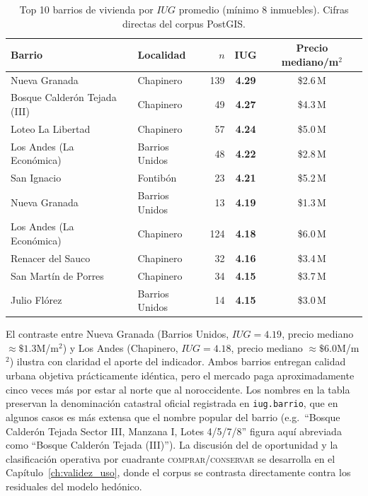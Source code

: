 \documentclass[12pt, a4paper, twoside, openright]{report}
\theoremstyle{plain}
\theoremstyle{definition}
\newcommand{\IUG}{IUG}             %
\begin{document}
\begin{table}[htbp]
\centering
\caption{Top 10 barrios de vivienda por $\IUG{}$ promedio (mínimo 8 inmuebles). Cifras directas del corpus PostGIS.}
\label{tab:iug_barrio_res}
\small
\begin{tabular}{@{}llrcc@{}}
\toprule
\textbf{Barrio} & \textbf{Localidad} & $n$ & $\boldsymbol{\IUG}$ & \textbf{Precio mediano/m$^2$} \\
\midrule
Nueva Granada                 & Chapinero      & 139 & \textbf{4.29} & \$2.6\,M \\
Bosque Calderón Tejada (III)  & Chapinero      &  49 & \textbf{4.27} & \$4.3\,M \\
Loteo La Libertad             & Chapinero      &  57 & \textbf{4.24} & \$5.0\,M \\
Los Andes (La Económica)      & Barrios Unidos &  48 & \textbf{4.22} & \$2.8\,M \\
San Ignacio                   & Fontibón       &  23 & \textbf{4.21} & \$5.2\,M \\
Nueva Granada                 & Barrios Unidos &  13 & \textbf{4.19} & \$1.3\,M \\
Los Andes (La Económica)      & Chapinero      & 124 & \textbf{4.18} & \$6.0\,M \\
Renacer del Sauco             & Chapinero      &  32 & \textbf{4.16} & \$3.4\,M \\
San Martín de Porres          & Chapinero      &  34 & \textbf{4.15} & \$3.7\,M \\
Julio Flórez                  & Barrios Unidos &  14 & \textbf{4.15} & \$3.0\,M \\
\bottomrule
\end{tabular}
\end{table}

El contraste entre Nueva Granada (Barrios Unidos, $\IUG{} = 4.19$, precio mediano $\approx \$1.3$M/m$^2$) y Los Andes (Chapinero, $\IUG{} = 4.18$, precio mediano $\approx \$6.0$M/m$^2$) ilustra con claridad el aporte del indicador. Ambos barrios entregan calidad urbana objetiva prácticamente idéntica, pero el mercado paga aproximadamente cinco veces más por estar al norte que al noroccidente. Los nombres en la tabla preservan la denominación catastral oficial registrada en \texttt{iug.barrio}, que en algunos casos es más extensa que el nombre popular del barrio (e.g.\ ``Bosque Calderón Tejada Sector III, Manzana I, Lotes 4/5/7/8'' figura aquí abreviada como ``Bosque Calderón Tejada (III)''). La discusión del \ratio{} de oportunidad y la clasificación operativa por cuadrante \textsc{comprar}/\textsc{conservar} se desarrolla en el Capítulo~\ref{ch:validez_uso}, donde el corpus se contrasta directamente contra los residuales del modelo hedónico.
\end{document}
